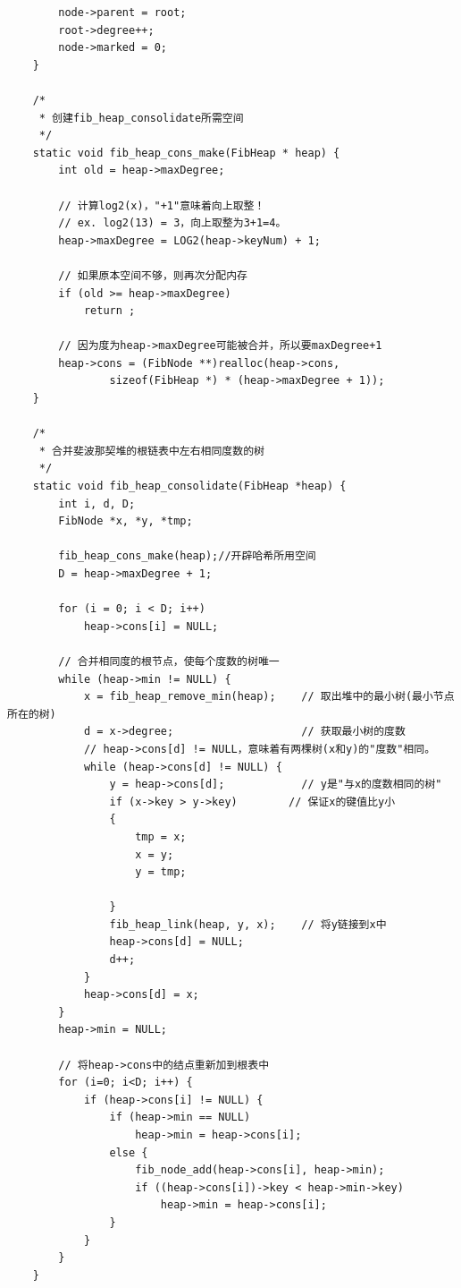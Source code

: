 \documentclass[UTF8]{ctexart}
\begin{document}
\begin{lstlisting}
        node->parent = root;
        root->degree++;
        node->marked = 0;
    }
    
    /*
     * 创建fib_heap_consolidate所需空间
     */
    static void fib_heap_cons_make(FibHeap * heap) {
        int old = heap->maxDegree;
    
        // 计算log2(x)，"+1"意味着向上取整！
        // ex. log2(13) = 3，向上取整为3+1=4。
        heap->maxDegree = LOG2(heap->keyNum) + 1;
    
        // 如果原本空间不够，则再次分配内存
        if (old >= heap->maxDegree)
            return ;
    
        // 因为度为heap->maxDegree可能被合并，所以要maxDegree+1
        heap->cons = (FibNode **)realloc(heap->cons,
                sizeof(FibHeap *) * (heap->maxDegree + 1));
    }
    
    /*
     * 合并斐波那契堆的根链表中左右相同度数的树
     */
    static void fib_heap_consolidate(FibHeap *heap) {
        int i, d, D;
        FibNode *x, *y, *tmp;
    
        fib_heap_cons_make(heap);//开辟哈希所用空间
        D = heap->maxDegree + 1;
    
        for (i = 0; i < D; i++)
            heap->cons[i] = NULL;
    
        // 合并相同度的根节点，使每个度数的树唯一
        while (heap->min != NULL) {
            x = fib_heap_remove_min(heap);    // 取出堆中的最小树(最小节点所在的树)
            d = x->degree;                    // 获取最小树的度数
            // heap->cons[d] != NULL，意味着有两棵树(x和y)的"度数"相同。
            while (heap->cons[d] != NULL) {
                y = heap->cons[d];            // y是"与x的度数相同的树"
                if (x->key > y->key)        // 保证x的键值比y小
                {
                    tmp = x;
                    x = y;
                    y = tmp;
    
                }
                fib_heap_link(heap, y, x);    // 将y链接到x中
                heap->cons[d] = NULL;
                d++;
            }
            heap->cons[d] = x;
        }
        heap->min = NULL;
    
        // 将heap->cons中的结点重新加到根表中
        for (i=0; i<D; i++) {
            if (heap->cons[i] != NULL) {
                if (heap->min == NULL)
                    heap->min = heap->cons[i];
                else {
                    fib_node_add(heap->cons[i], heap->min);
                    if ((heap->cons[i])->key < heap->min->key)
                        heap->min = heap->cons[i];
                }
            }
        }
    }
    

\end{lstlisting}
\end{document}
